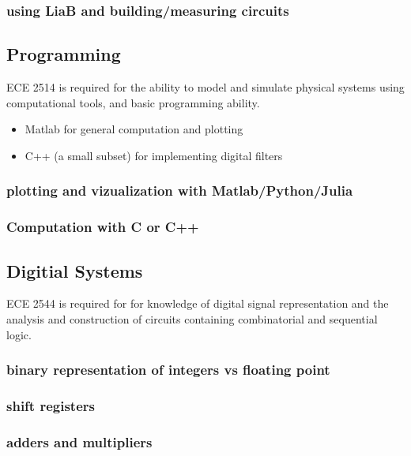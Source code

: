 \subsubsection*{using LiaB and building/measuring circuits}

\subsection{Programming}

ECE 2514 is required for the ability to model and simulate physical systems using computational tools, and basic programming ability.

\begin{itemize}
\item Matlab for general computation and plotting
\item C++ (a small subset) for implementing digital filters
\end{itemize}

\subsubsection*{plotting and vizualization with Matlab/Python/Julia}

\subsubsection*{Computation with C or C++}

\subsection{Digitial Systems}

ECE 2544 is required for for knowledge of digital signal representation and the analysis and construction of circuits containing combinatorial and sequential logic.

\subsubsection*{binary representation of integers vs floating point}

\subsubsection*{shift registers}

\subsubsection*{adders and multipliers}
